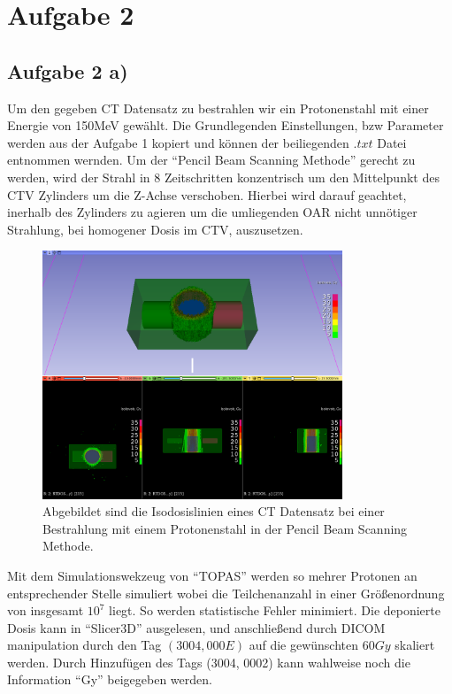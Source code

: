 \section{Aufgabe 2}
\subsection{Aufgabe 2 a)}
Um den gegeben CT Datensatz zu bestrahlen wir ein Protonenstahl mit einer Energie von 150\si{MeV} gewählt.
Die Grundlegenden Einstellungen, bzw Parameter werden aus der Aufgabe 1 kopiert und können der beiliegenden $.txt$ Datei entnommen wernden.
Um der \enquote{Pencil Beam Scanning Methode} gerecht zu werden, wird der Strahl in 8 Zeitschritten
konzentrisch um den Mittelpunkt des CTV Zylinders um die Z-Achse verschoben. 
Hierbei wird darauf geachtet, inerhalb des Zylinders zu agieren um die umliegenden OAR nicht unnötiger Strahlung, bei homogener Dosis im CTV, auszusetzen. 
\begin{figure}
    \centering
    \includegraphics[width= 0.8\textwidth]{content/iso.png}
    \caption{Abgebildet sind die Isodosislinien eines CT Datensatz bei einer Bestrahlung mit einem Protonenstahl in der Pencil Beam Scanning
    Methode.}
\end{figure}
Mit dem Simulationswekzeug von \enquote{TOPAS} werden so mehrer Protonen an entsprechender Stelle simuliert wobei die Teilchenanzahl in einer Größenordnung 
von insgesamt $10^7$ liegt. So werden statistische Fehler minimiert. Die deponierte Dosis kann in \enquote{Slicer3D} ausgelesen,
und anschließend durch DICOM manipulation durch den Tag $(3004, 000E)$ auf die gewünschten $60 Gy$ skaliert werden. 
Durch Hinzufügen des Tags (3004, 0002) kann wahlweise noch die Information \enquote{Gy} beigegeben werden.

